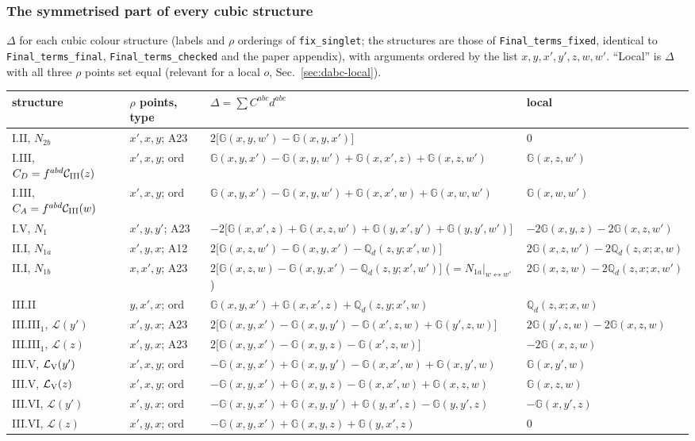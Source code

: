 \documentclass[10pt]{article}
\def\mf#1{\mathbb{#1}}
\begin{document}
\subsubsection{The symmetrised part of every cubic structure}\label{sec:dabc-table}
\noindent $\Delta$ for each cubic colour structure (labels and $\rho$ orderings of \texttt{fix\_singlet}; the structures are those of \texttt{Final\_terms\_fixed}, identical to \texttt{Final\_terms\_final}, \texttt{Final\_terms\_checked} and the paper appendix), with arguments ordered by the list $x,y,x',y',z,w,w'$. ``Local'' is $\Delta$ with all three $\rho$ points set equal (relevant for a local $o$, Sec.~\ref{sec:dabc-local}).
\begin{center}
\renewcommand{\arraystretch}{1.35}
\small\begin{tabular}{|l|l|l|l|}\hline
structure & $\rho$ points, type & $\Delta=\sum C^{abc}d^{abc}$ & local \\\hline
I.II, $N_{2b}$ & $x',x,y$; A23 & $2\big[\mf{G}(x,y,w')-\mf{G}(x,y,x')\big]$ & $0$\\
I.III, $C_{D}=f^{abd}\mathcal{C}_{\rm III}(z)$ & $x',x,y$; ord & $\mf{G}(x,y,x')-\mf{G}(x,y,w')+\mf{G}(x,x',z)+\mf{G}(x,z,w')$ & $\mf{G}(x,z,w')$\\
I.III, $C_{A}=f^{abd}\mathcal{C}_{\rm III}(w)$ & $x',x,y$; ord & $\mf{G}(x,y,x')-\mf{G}(x,y,w')+\mf{G}(x,x',w)+\mf{G}(x,w,w')$ & $\mf{G}(x,w,w')$\\
I.V, $N_{1}$ & $x',y,y'$; A23 & $-2\big[\mf{G}(x,x',z)+\mf{G}(x,z,w')+\mf{G}(y,x',y')+\mf{G}(y,y',w')\big]$ & $-2\mf{G}(x,y,z)-2\mf{G}(x,z,w')$\\
II.I, $N_{1a}$ & $x',y,x$; A12 & $2\big[\mf{G}(x,z,w')-\mf{G}(x,y,x')-\mf{Q}_{d}(z,y;x',w)\big]$ & $2\mf{G}(x,z,w')-2\mf{Q}_{d}(z,x;x,w)$\\
II.I, $N_{1b}$ & $x,x',y$; A23 & $2\big[\mf{G}(x,z,w)-\mf{G}(x,y,x')-\mf{Q}_{d}(z,y;x',w')\big]$ ($=N_{1a}|_{w\leftrightarrow w'}$) & $2\mf{G}(x,z,w)-2\mf{Q}_{d}(z,x;x,w')$\\
III.II & $y,x',x$; ord & $\mf{G}(x,y,x')+\mf{G}(x,x',z)+\mf{Q}_{d}(z,y;x',w)$ & $\mf{Q}_{d}(z,x;x,w)$\\
III.III$_{1}$, $\mathcal{L}(y')$ & $x',y,x$; A23 & $2\big[\mf{G}(x,y,x')-\mf{G}(x,y,y')-\mf{G}(x',z,w)+\mf{G}(y',z,w)\big]$ & $2\mf{G}(y',z,w)-2\mf{G}(x,z,w)$\\
III.III$_{1}$, $\mathcal{L}(z)$ & $x',y,x$; A23 & $2\big[\mf{G}(x,y,x')-\mf{G}(x,y,z)-\mf{G}(x',z,w)\big]$ & $-2\mf{G}(x,z,w)$\\
III.V, $\mathcal{L}_{\rm V}(y')$ & $x',x,y$; ord & $-\mf{G}(x,y,x')+\mf{G}(x,y,y')-\mf{G}(x,x',w)+\mf{G}(x,y',w)$ & $\mf{G}(x,y',w)$\\
III.V, $\mathcal{L}_{\rm V}(z)$ & $x',x,y$; ord & $-\mf{G}(x,y,x')+\mf{G}(x,y,z)-\mf{G}(x,x',w)+\mf{G}(x,z,w)$ & $\mf{G}(x,z,w)$\\
III.VI, $\mathcal{L}(y')$ & $x',y,x$; ord & $-\mf{G}(x,y,x')+\mf{G}(x,y,y')+\mf{G}(y,x',z)-\mf{G}(y,y',z)$ & $-\mf{G}(x,y',z)$\\
III.VI, $\mathcal{L}(z)$ & $x',y,x$; ord & $-\mf{G}(x,y,x')+\mf{G}(x,y,z)+\mf{G}(y,x',z)$ & $0$\\\hline
\end{tabular}
\end{center}
\end{document}
